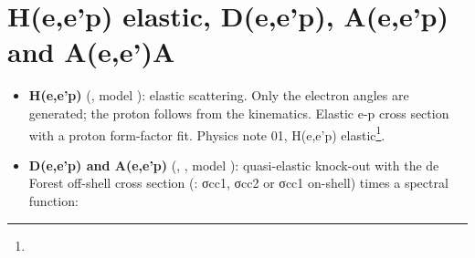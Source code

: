 \section{\texorpdfstring{H(e,e'p) elastic, D(e,e'p), A(e,e'p) and A(e,e')A}{H(e,e'p) elastic, D(e,e'p), A(e,e'p) and A(e,e')A}}\label{user_manual-05u5freactions:52-heep-elastic-deep-aeep-and-aeea}
\begin{itemize}
\item \textbf{H(e,e'p)} (, model ): elastic scattering. Only the electron angles are generated; the
proton follows from the kinematics. Elastic e-p cross section with a proton form-factor fit. Physics note 01, H(e,e'p)
elastic\footnote{}.
\item \textbf{D(e,e'p) and A(e,e'p)} (, , model ): quasi-elastic knock-out with the de Forest
off-shell cross section (\hyperref[param:deForestu5fflag]{}: σcc1, σcc2 or σcc1 on-shell) times a spectral function:


\end{itemize}
